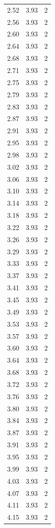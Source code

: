 \begin{longtable}{lrr}
  2.52 & 3.93 & 2 \\
  2.56 & 3.93 & 2 \\
  2.60 & 3.93 & 2 \\
  2.64 & 3.93 & 2 \\
  2.68 & 3.93 & 2 \\
  2.71 & 3.93 & 2 \\
  2.75 & 3.93 & 2 \\
  2.79 & 3.93 & 2 \\
  2.83 & 3.93 & 2 \\
  2.87 & 3.93 & 2 \\
  2.91 & 3.93 & 2 \\
  2.95 & 3.93 & 2 \\
  2.98 & 3.93 & 2 \\
  3.02 & 3.93 & 2 \\
  3.06 & 3.93 & 2 \\
  3.10 & 3.93 & 2 \\
  3.14 & 3.93 & 2 \\
  3.18 & 3.93 & 2 \\
  3.22 & 3.93 & 2 \\
  3.26 & 3.93 & 2 \\
  3.29 & 3.93 & 2 \\
  3.33 & 3.93 & 2 \\
  3.37 & 3.93 & 2 \\
  3.41 & 3.93 & 2 \\
  3.45 & 3.93 & 2 \\
  3.49 & 3.93 & 2 \\
  3.53 & 3.93 & 2 \\
  3.57 & 3.93 & 2 \\
  3.60 & 3.93 & 2 \\
  3.64 & 3.93 & 2 \\
  3.68 & 3.93 & 2 \\
  3.72 & 3.93 & 2 \\
  3.76 & 3.93 & 2 \\
  3.80 & 3.93 & 2 \\
  3.84 & 3.93 & 2 \\
  3.87 & 3.93 & 2 \\
  3.91 & 3.93 & 2 \\
  3.95 & 3.93 & 2 \\
  3.99 & 3.93 & 2 \\
  4.03 & 3.93 & 2 \\
  4.07 & 3.93 & 2 \\
  4.11 & 3.93 & 2 \\
  4.15 & 3.93 & 2 \\

\end{longtable}
